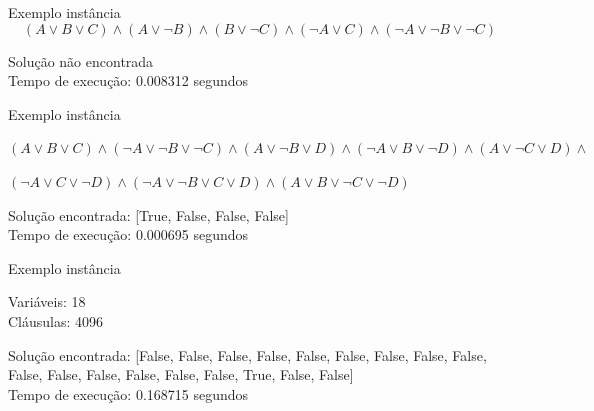 \documentclass[compress,aspectratio=169]{beamer}
\begin{document}
    \begin{frame}{Exemplo instância}
        \[(A \lor B \lor C) \land (A \lor \neg B) \land (B \lor \neg C) \land (\neg A \lor C) \land (\neg A \lor \neg B \lor \neg C)\]
        
        \begin{tcolorbox}[title=Saída da instância, width=\linewidth, fontupper=\ttfamily, halign=flush left]
            Solução não encontrada \\
            Tempo de execução: 0.008312 segundos  
        \end{tcolorbox}
    \end{frame}
    \begin{frame}{Exemplo instância}
        \begin{center}
            \((A \lor B \lor C) \land (\neg A \lor \neg B \lor \neg C) \land (A \lor \neg B \lor D) \land (\neg A \lor B \lor \neg D) \land (A \lor \neg C \lor D) \land \)

            \((\neg A \lor C \lor \neg D) \land (\neg A \lor \neg B \lor C \lor D) \land (A \lor B \lor \neg C \lor \neg D)\)
            
        \end{center}
        
        \begin{tcolorbox}[title=Saída da instância, width=\linewidth, fontupper=\ttfamily, halign=flush left]
            Solução encontrada: [True, False, False, False] \\
            Tempo de execução: 0.000695 segundos
        \end{tcolorbox}
    \end{frame}
    \begin{frame}{Exemplo instância}
        \begin{tcolorbox}[title=Entrada da instância, width=\linewidth, fontupper=\ttfamily,  halign=flush left]
            Variáveis: 18 \\
            Cláusulas: 4096
        \end{tcolorbox}
        \begin{tcolorbox}[title=Saída da instância, width=\linewidth, fontupper=\ttfamily, halign=flush left]
            Solução encontrada: [False, False, False, False, False, False, False, False, False, False, False, False, False, False, False, True, False, False] \\
            Tempo de execução: 0.168715 segundos
        \end{tcolorbox}
    \end{frame}
\end{document}
